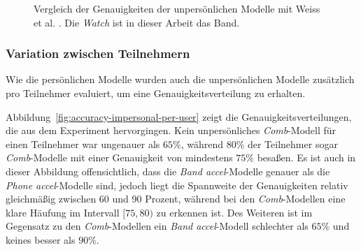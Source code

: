 \begin{figure}
	\centering
	\caption[Vergleich der Genauigkeiten der unpersönlichen Modelle mit Weiss et al. \cite{Weiss2016}]{Vergleich der Genauigkeiten der unpersönlichen Modelle mit Weiss et al. \cite{Weiss2016}. Die \textit{Watch} ist in dieser Arbeit das Band.}
	\label{fig:accuracy-impersonal-vs-weiss}
\end{figure}

\newpage

\subsubsection{Variation zwischen Teilnehmern}

Wie die persönlichen Modelle wurden auch die unpersönlichen Modelle zusätzlich pro Teilnehmer evaluiert, um eine Genauigkeitsverteilung zu erhalten.

Abbildung~\ref{fig:accuracy-impersonal-per-user} zeigt die Genauigkeitsverteilungen, die aus dem Experiment hervorgingen. Kein unpersönliches \textit{Comb}-Modell für einen Teilnehmer war ungenauer als $65 \%$, während $80 \%$ der Teilnehmer sogar \textit{Comb}-Modelle mit einer Genauigkeit von mindestens $75 \%$ besaßen. Es ist auch in dieser Abbildung offensichtlich, dass die \textit{Band accel}-Modelle genauer als die \textit{Phone accel}-Modelle sind, jedoch liegt die Spannweite der Genauigkeiten relativ gleichmäßig zwischen 60 und 90 Prozent, während bei den \textit{Comb}-Modellen eine klare Häufung im Intervall $[75, 80)$ zu erkennen ist. Des Weiteren ist im Gegensatz zu den \textit{Comb}-Modellen ein \textit{Band accel}-Modell schlechter als $65 \%$ und keines besser als $90 \%$.

